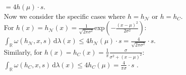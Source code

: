 \documentclass{article}
\begin{document}
\hspace*{2.9cm}$= 4h(\mu)\cdot s  $.  \\
Now we consider the specific cases where $h = h_{\mathcal{N}}$ or $h = h_{C}$.\\
For $h(x) = h_{\mathcal{N}}(x)  = \frac{1}{\sqrt{2 \pi \sigma ^2}} \text{exp}(- \frac{(x-\mu)^2}{2 \sigma ^2}) $:   \vspace*{0.5em}  $ \displaystyle{ \int_{ \mathbb{R} }  \omega (h_{\mathcal{N}},x,s)  \, \text{d}\lambda(x) } \leq 4h_{\mathcal{N}}(\mu)\cdot s =  \frac{4}{\sqrt{2 \pi \sigma^2}} \cdot s  $.  \vspace*{0.5em}  \\
Similarly, for $h(x) = h_{C}(x)  = \frac{1}{ \pi }  \frac{ \sigma }{  \sigma ^2 + (x-\mu)^2  }  $:   \vspace*{0.5em} 
$ \displaystyle{ \int_{ \mathbb{R} }  \omega (h_{C},x,s)  \, \text{d}\lambda(x) } \leq 4h_{C}(\mu) = \frac{4}{ \pi \sigma} \cdot s$ .  \\







\newpage
\end{document}
